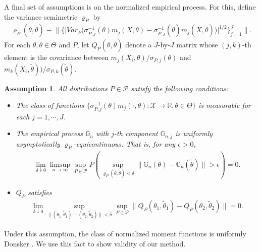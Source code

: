 \documentclass[letterpaper,11pt]{article}
\theoremstyle{myplain}
\theoremstyle{mydefinition}
\newtheorem{assumption}{Assumption}[section]
\theoremstyle{myremark}
\newcommand{\cP}{\mathcal{P}}
\numberwithin{equation}{section}
\numberwithin{figure}{section}
\begin{document}
\begin{appendices}
A final set of assumptions is on the normalized empirical process. For this,
define the variance semimetric $\varrho_P$ by
\begin{align}
	\varrho_{P}(\theta,\tilde{\theta})\equiv \Big\|\big\{\big[Var_P\big(\sigma_{P,j}^{-1}(\theta)m_j(X,\theta)-\sigma_{P,j}^{-1}(\tilde{\theta})m_j(X,\tilde{\theta})\big)\big]^{1/2}\big\}_{j=1}^J\Big\|.
\end{align}
For each $\theta,\tilde{\theta}\in\Theta$ and $P$, let $Q_P(\theta,\tilde{\theta})$ denote a $J$-by-$J$ matrix whose $(j,k)$-th element is the covariance between 
$m_j(X_i,\theta)/\sigma_{P,j}(\theta)$ and $m_k(X_i,\tilde{\theta}))/\sigma_{P,k}(\tilde{\theta})$.
\begin{assumption}\label{as:bcs1}
All distributions $P \in \cP$ satisfy the following conditions:
\begin{itemize}
\item [(i)]	The class of functions $\{\sigma_{P,j}^{-1}(\theta)m_j(\cdot,\theta):\mathcal X\to\mathbb R,\theta\in\Theta\}$ is measurable for each $j=1,\cdots, J$.
\item [(ii)]  The empirical process $\mathbb G_{n}$ with $j$-th component $\mathbb G_{n,j}$ is uniformly asymptotically $\varrho_P$-equicontinuous. That is, for any $\epsilon>0$,
	\begin{align}
		\lim_{\delta\downarrow 0}\limsup_{n\to\infty}\sup_{P\in\mathcal P}P\left(\sup_{\varrho_P(\theta,\tilde{\theta})<\delta}\|\mathbb G_{n}(\theta)-\mathbb G_{n}(\tilde{\theta})\|>\epsilon\right)=0.
	\end{align}
\item [(iii)] $Q_P$ satisfies
\begin{align}
	\lim_{\delta\downarrow 0}\sup_{\|(\theta_1,\tilde{\theta}_1)-(\theta_2,\tilde{\theta}_2)\|<\delta}\sup_{P\in\mathcal P}\|Q_P(\theta_1,\tilde{\theta}_1)-Q_P(\theta_2,\tilde{\theta}_2)\|=0.	
\end{align}	
\end{itemize}	
\end{assumption}
Under this assumption, the class of  normalized moment functions is uniformly Donsker \citep{Bugni:2015jk}. We use this fact to show validity of our method.


\end{appendices}
\end{document}
